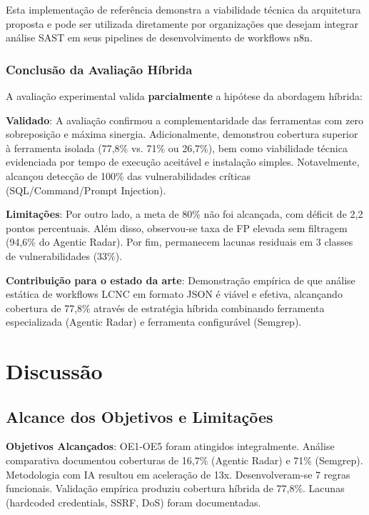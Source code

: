 \documentclass[12pt,a4paper]{article}
\begin{document}
Esta implementação de referência demonstra a viabilidade técnica da arquitetura proposta e pode ser utilizada diretamente por organizações que desejam integrar análise SAST em seus pipelines de desenvolvimento de workflows n8n.

\subsubsection{Conclusão da Avaliação Híbrida}

A avaliação experimental valida \textbf{parcialmente} a hipótese da abordagem híbrida:

\textbf{Validado}: A avaliação confirmou a complementaridade das ferramentas com zero sobreposição e máxima sinergia. Adicionalmente, demonstrou cobertura superior à ferramenta isolada (77,8\% vs. 71\% ou 26,7\%), bem como viabilidade técnica evidenciada por tempo de execução aceitável e instalação simples. Notavelmente, alcançou detecção de 100\% das vulnerabilidades críticas (SQL/Command/Prompt Injection).

\textbf{Limitações}: Por outro lado, a meta de 80\% não foi alcançada, com déficit de 2,2 pontos percentuais. Além disso, observou-se taxa de FP elevada sem filtragem (94,6\% do Agentic Radar). Por fim, permanecem lacunas residuais em 3 classes de vulnerabilidades (33\%).

\textbf{Contribuição para o estado da arte}: Demonstração empírica de que análise estática de workflows LCNC em formato JSON é viável e efetiva, alcançando cobertura de 77,8\% através de estratégia híbrida combinando ferramenta especializada (Agentic Radar) e ferramenta configurável (Semgrep).

\section{Discussão}
\label{sec:discussao}

\subsection{Alcance dos Objetivos e Limitações}

\textbf{Objetivos Alcançados}: OE1-OE5 foram atingidos integralmente. Análise comparativa documentou coberturas de 16,7\% (Agentic Radar) e 71\% (Semgrep). Metodologia com IA resultou em aceleração de 13x. Desenvolveram-se 7 regras funcionais. Validação empírica produziu cobertura híbrida de 77,8\%. Lacunas (hardcoded credentials, SSRF, DoS) foram documentadas.
\end{document}
